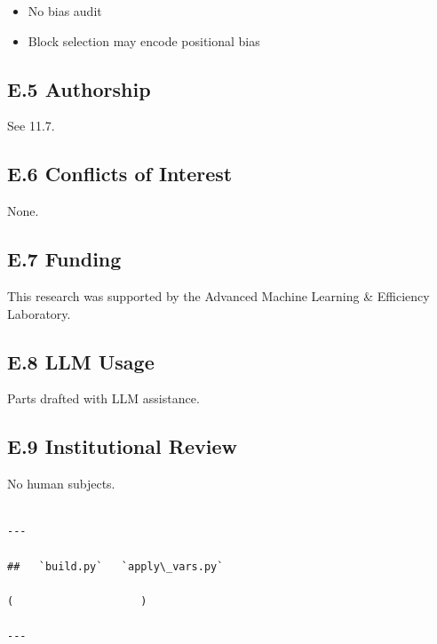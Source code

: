 \begin{itemize}
\item No bias audit
\item Block selection may encode positional bias

\end{itemize}
\subsection{E.5 Authorship}

See  11.7.

\subsection{E.6 Conflicts of Interest}

None.

\subsection{E.7 Funding}

This research was supported by the Advanced Machine Learning \& Efficiency Laboratory.

\subsection{E.8 LLM Usage}

Parts drafted with LLM assistance.

\subsection{E.9 Institutional Review}

No human subjects.
\begin{lstlisting}

---

##   `build.py`   `apply\_vars.py`

(                    )

---
\end{lstlisting}